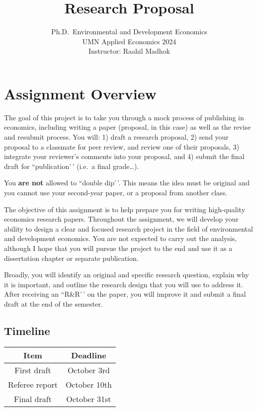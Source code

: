 \documentclass[
]{article}
\title{Research Proposal}
\subtitle{Ph.D.~Environmental and Development Economics\\
UMN Applied Economics 2024\\
Instructor: Raahil Madhok}
\author{}
\date{\vspace{-2.5em}}
\begin{document}
\maketitle

\hypertarget{assignment-overview}{%
\section{Assignment Overview}\label{assignment-overview}}

The goal of this project is to take you through a mock process of publishing in economics, including writing a paper (proposal, in this case) as well as the revise and resubmit process. You will: 1) draft a research proposal, 2) send your proposal to a classmate for peer review, and review one of their proposals, 3) integrate your reviewer's comments into your proposal, and 4) submit the final draft for ``publication'\,' (i.e.~a final grade\ldots).

You \textbf{are not} allowed to ``double dip'\,'. This means the idea must be original and you cannot use your second-year paper, or a proposal from another class.

The objective of this assignment is to help prepare you for writing high-quality economics research papers. Throughout the assignment, we will develop your ability to design a clear and focused research project in the field of environmental and development economics. You are not expected to carry out the analysis, although I hope that you will pursue the project to the end and use it as a dissertation chapter or separate publication.

Broadly, you will identify an original and specific research question, explain why it is important, and outline the research design that you will use to address it. After receiving an ``R\&R'\,' on the paper, you will improve it and submit a final draft at the end of the semester.

\hypertarget{timeline}{%
\subsection{Timeline}\label{timeline}}

\begin{table}[ht]
\begin{tabular}{|c|c|}
\hline
\textbf{Item} & \textbf{Deadline} \\ \hline
First draft     & October 3rd     \\ \hline
Referee report    & October 10th     \\ \hline
Final draft    & October 31st     \\ \hline
\end{tabular}
\end{table}
\end{document}
